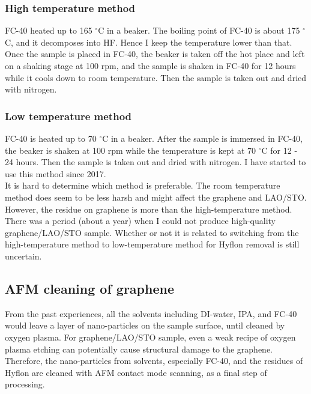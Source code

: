 \documentclass[pdflatex, sectionletters, 12pt]{pittetd}    %
\begin{document}
\subsubsection{High temperature method} FC-40 heated up to 165 $^{\circ}$C in a beaker. The boiling point of FC-40 is about 175 $^{\circ}$C, and it decomposes into HF. Hence I keep the temperature lower than that. Once the sample is placed in FC-40, the beaker is taken off the hot place and left on a shaking stage at 100 rpm, and the sample is shaken in FC-40 for 12 hours while it cools down to room temperature. Then the sample is taken out and dried with nitrogen.

\subsubsection{Low temperature method} FC-40 is heated up to 70 $^{\circ}$C in a beaker. After the sample is immersed in FC-40, the beaker is shaken at 100 rpm while the temperature is kept at 70 $^{\circ}$C for 12 - 24 hours. Then the sample is taken out and dried with nitrogen. I have started to use this method since 2017.
\\

It is hard to determine which method is preferable. The room temperature method does seem to be less harsh and might affect the graphene and LAO/STO. However, the residue on graphene is more than the high-temperature method. There was a period (about a year) when I could not produce high-quality graphene/LAO/STO sample. Whether or not it is related to switching from the high-temperature method to low-temperature method for Hyflon removal is still uncertain.

\subsection{AFM cleaning of graphene}

From the past experiences, all the solvents including DI-water, IPA, and FC-40 would leave a layer of nano-particles on the sample surface, until cleaned by oxygen plasma. For graphene/LAO/STO sample, even a weak recipe of oxygen plasma etching can potentially cause structural damage to the graphene. Therefore, the nano-particles from solvents, especially FC-40, and the residues of Hyflon are cleaned with AFM contact mode scanning, as a final step of processing. 
\end{document}
